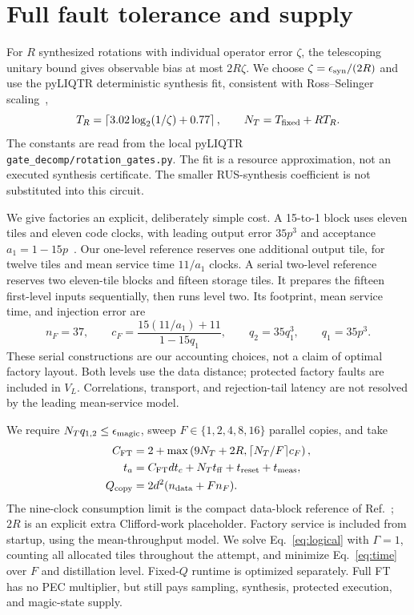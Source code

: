 \documentclass[11pt]{article}
\newcommand{\eps}{\epsilon}
\begin{document}
\section{Full fault tolerance and supply}
For $R$ synthesized rotations with individual operator error $\zeta$, the
telescoping unitary bound gives observable bias at most $2R\zeta$.
We choose $\zeta=\eps_{\rm syn}/(2R)$ and use the pyLIQTR deterministic
synthesis fit, consistent with Ross--Selinger scaling~\cite{ross},
\begin{equation}
 T_R=\left\lceil3.02\log_2(1/\zeta)+0.77\right\rceil,\qquad
 N_T=T_{\rm fixed}+RT_R.
\end{equation}
The constants are read from the local pyLIQTR
\texttt{gate\_decomp/rotation\_gates.py}. The fit is a resource approximation,
not an executed synthesis certificate.
The smaller RUS-synthesis coefficient is not substituted into this circuit.

We give factories an explicit, deliberately simple cost. A 15-to-1 block
uses eleven tiles and eleven code clocks, with leading output error $35p^3$
and acceptance $a_1=1-15p$~\cite{litinski}. Our one-level reference reserves
one additional output tile, for twelve tiles and mean service time $11/a_1$
clocks. A serial two-level reference reserves two eleven-tile blocks and
fifteen storage tiles. It prepares the fifteen first-level inputs sequentially,
then runs level two. Its footprint, mean service time, and injection error are
\begin{equation}
 n_F=37,\qquad c_F=\frac{15(11/a_1)+11}{1-15q_1},\qquad
 q_2=35q_1^3,\qquad q_1=35p^3.
\end{equation}
These serial constructions are our accounting choices, not a claim of optimal
factory layout. Both levels use the data distance; protected factory faults
are included in $V_L$. Correlations, transport, and rejection-tail latency
are not resolved by the leading mean-service model.

We require $N_Tq_{1,2}\leq\eps_{\rm magic}$, sweep
$F\in\{1,2,4,8,16\}$ parallel copies, and take
\begin{align}
 C_{\rm FT}&=2+\max\left(9N_T+2R,\lceil N_T/F\rceil c_F\right),\\
 t_a&=C_{\rm FT}dt_c+N_Tt_{\rm ff}+t_{\rm reset}+t_{\rm meas},\\
 Q_{\rm copy}&=2d^2(n_{\rm data}+Fn_F).
\end{align}
The nine-clock consumption limit is the compact data-block reference of
Ref.~\cite{litinski}; $2R$ is an explicit extra Clifford-work placeholder.
Factory service is included from startup, using the mean-throughput model.
We solve Eq.~\eqref{eq:logical} with $\Gamma=1$, counting all allocated
tiles throughout the attempt, and minimize Eq.~\eqref{eq:time} over $F$ and
distillation level. Fixed-$Q$ runtime is optimized separately. Full FT has
no PEC multiplier, but still pays sampling, synthesis, protected execution,
and magic-state supply.
\end{document}
